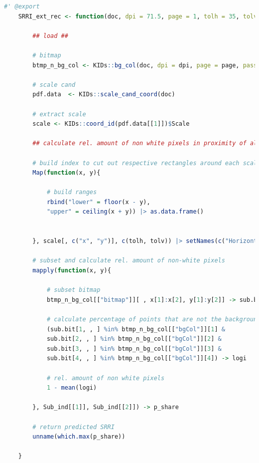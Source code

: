 \documentclass[aodsor,preprint]{imsart}
\numberwithin{equation}{section}
\theoremstyle{plain}
\begin{document}
\begin{lstlisting}[language = R, basicstyle = \tiny]
	#' @export
	SRRI_ext_rec <- function(doc, dpi = 71.5, page = 1, tolh = 35, tolv = 10.5, pass = FALSE){
		
		## load ##
		
		# bitmap
		btmp_n_bg_col <- KIDs::bg_col(doc, dpi = dpi, page = page, pass = pass)
		
		# scale cand
		pdf.data  <- KIDs::scale_cand_coord(doc)
		
		# extract scale
		scale <- KIDs::coord_id(pdf.data[[1]])$Scale
		
		## calculate rel. amount of non white pixels in proximity of all scale entries ##
		
		# build index to cut out respective rectangles around each scale point
		Map(function(x, y){
			
			# build ranges
			rbind("lower" = floor(x - y),
			"upper" = ceiling(x + y)) |> as.data.frame()
			
			
		}, scale[, c("x", "y")], c(tolh, tolv)) |> setNames(c("Horizontal", "Vertical")) -> Sub_ind
		
		# subset and calculate rel. amount of non-white pixels
		mapply(function(x, y){
			
			# subset bitmap
			btmp_n_bg_col[["bitmap"]][ , x[1]:x[2], y[1]:y[2]] -> sub.bit
			
			# calculate percentage of points that are not the background color
			(sub.bit[1, , ] %in% btmp_n_bg_col[["bgCol"]][1] &
			sub.bit[2, , ] %in% btmp_n_bg_col[["bgCol"]][2] &
			sub.bit[3, , ] %in% btmp_n_bg_col[["bgCol"]][3] &
			sub.bit[4, , ] %in% btmp_n_bg_col[["bgCol"]][4]) -> logi
			
			# rel. amount of non white pixels
			1 - mean(logi)
			
		}, Sub_ind[[1]], Sub_ind[[2]]) -> p_share
		
		# return predicted SRRI
		unname(which.max(p_share))
		
	}

\end{lstlisting}




\newpage
\printbibliography
\end{document}
